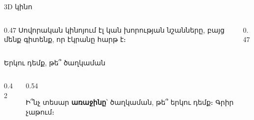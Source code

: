 \begin{frame}{3D կինո}
  \centering
  \par\bigskip
  \begin{columns}[T]
    \begin{column}{0.47\textwidth}
      \small Սովորական կինոյում էլ կան խորության նշանները, բայց մենք գիտենք, որ էկրանը հարթ է։
    \end{column}
    \begin{column}{0.47\textwidth}
    \end{column}
  \end{columns}
\end{frame}

\begin{frame}{Երկու դեմք, թե՞ ծաղկաման}
  \begin{columns}[c]
    \begin{column}{0.42\textwidth}
      \centering
      
    \end{column}
    \begin{column}{0.54\textwidth}
      \begin{chatbox}
        Ի՞նչ տեսար \textbf{առաջինը}՝ ծաղկաման, թե՞ երկու դեմք։ Գրիր չաթում։
      \end{chatbox}
      \vspace{1mm}
    \end{column}
  \end{columns}
\end{frame}


